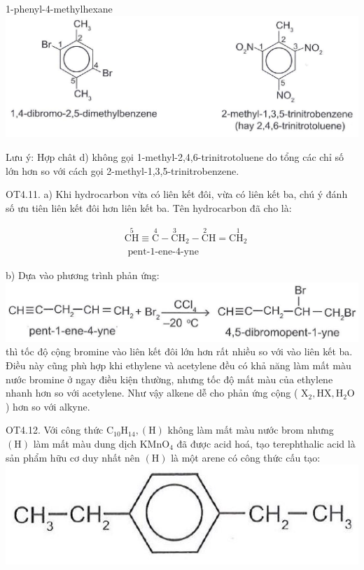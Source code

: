 \documentclass[10pt]{article}
\begin{document}
1-phenyl-4-methylhexane\\
\includegraphics[max width=\textwidth, center]{2025_10_23_adad5b98d65ac6665838g-30(5)}

Lưu ý: Hợp chât d) không gọi 1-methyl-2,4,6-trinitrotoluene do tổng các chỉ số lớn hơn so với cách gọi 2-methyl-1,3,5-trinitrobenzene.

OT4.11. a) Khi hydrocarbon vừa có liên kết đôi, vừa có liên kết ba, chú ý đánh số ưu tiên liên kết đôi hơn liên kết ba. Tên hydrocarbon đã cho là:

$$
\begin{aligned}
& \stackrel{5}{\mathrm{CH}} \equiv \stackrel{4}{\mathrm{C}}-\stackrel{3}{\mathrm{C}} \mathrm{H}_{2}-\stackrel{2}{\mathrm{C}} \mathrm{H}=\stackrel{1}{\mathrm{CH}_{2}} \\
& \text { pent-1-ene-4-yne }
\end{aligned}
$$

b) Dựa vào phương trình phản ứng:\\
\includegraphics[max width=\textwidth, center]{2025_10_23_adad5b98d65ac6665838g-30(2)}\\
thì tốc độ cộng bromine vào liên kết đôi lớn hơn rất nhiều so với vào liên kết ba. Điều này cũng phù hợp khi ethylene và acetylene đều có khả năng làm mất màu nước bromine ở ngay điều kiện thường, nhưng tốc độ mất màu của ethylene nhanh hơn so với acetylene. Như vậy alkene dễ cho phản ứng cộng ( $\mathrm{X}_{2}, \mathrm{HX}, \mathrm{H}_{2} \mathrm{O}$ ) hơn so với alkyne.

OT4.12. Với công thức $\mathrm{C}_{10} \mathrm{H}_{14},(\mathrm{H})$ không làm mất màu nước brom nhưng $(\mathrm{H})$ làm mất màu dung dịch $\mathrm{KMnO}_{4}$ đã được acid hoá, tạo terephthalic acid là sản phẩm hữu cơ duy nhất nên $(\mathrm{H})$ là một arene có công thức cấu tạo:\\
\includegraphics[max width=\textwidth, center]{2025_10_23_adad5b98d65ac6665838g-30}
\end{document}
